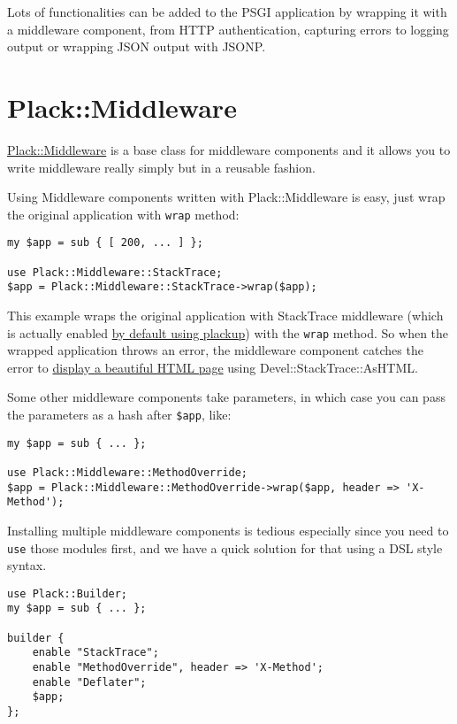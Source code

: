Lots of functionalities can be added to the PSGI application by wrapping
it with a middleware component, from HTTP authentication, capturing
errors to logging output or wrapping JSON output with JSONP.

\section{Plack::Middleware}\label{plackmiddleware}

\href{http://search.cpan.org/perldoc?Plack::Middleware}{Plack::Middleware}
is a base class for middleware components and it allows you to write
middleware really simply but in a reusable fashion.

Using Middleware components written with Plack::Middleware is easy, just
wrap the original application with \lstinline!wrap! method:

\begin{lstlisting}
my $app = sub { [ 200, ... ] };

use Plack::Middleware::StackTrace;
$app = Plack::Middleware::StackTrace->wrap($app);
\end{lstlisting}

This example wraps the original application with StackTrace middleware
(which is actually enabled
\href{http://advent.plackperl.org/2009/12/day-3-using-plackup.html}{by
default using plackup}) with the \lstinline!wrap! method. So when the
wrapped application throws an error, the middleware component catches
the error to
\href{http://bulknews.typepad.com/blog/2009/10/develstacktraceashtml.html}{display
a beautiful HTML page} using Devel::StackTrace::AsHTML.

Some other middleware components take parameters, in which case you can
pass the parameters as a hash after \lstinline!$app!, like:

\begin{lstlisting}
my $app = sub { ... };

use Plack::Middleware::MethodOverride;
$app = Plack::Middleware::MethodOverride->wrap($app, header => 'X-Method');
\end{lstlisting}

Installing multiple middleware components is tedious especially since
you need to \lstinline!use! those modules first, and we have a quick
solution for that using a DSL style syntax.

\begin{lstlisting}
use Plack::Builder;
my $app = sub { ... };

builder {
    enable "StackTrace";
    enable "MethodOverride", header => 'X-Method';
    enable "Deflater";
    $app;
};
\end{lstlisting}

